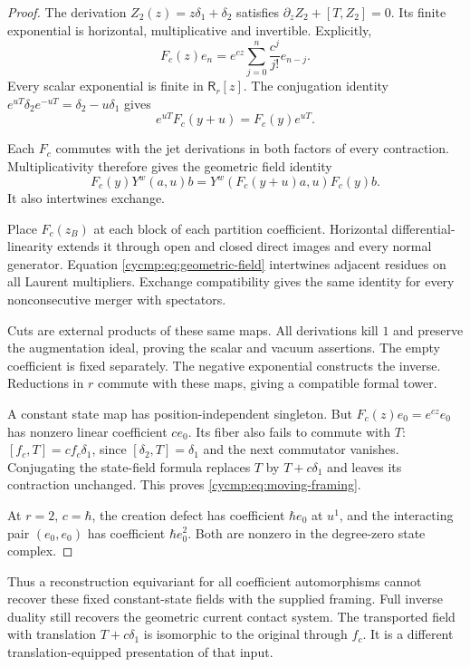 \begin{proof}
The derivation $Z_2(z)=z\delta_1+\delta_2$ satisfies
$\partial_zZ_2+[T,Z_2]=0$. Its finite exponential is horizontal,
multiplicative and invertible. Explicitly,
\[
 F_c(z)e_n=e^{cz}\sum_{j=0}^n\frac{c^j}{j!}e_{n-j}.
\]
Every scalar exponential is finite in $\mathsf R_r[z]$.
The conjugation identity
$e^{uT}\delta_2e^{-uT}=\delta_2-u\delta_1$ gives
\[
 e^{uT}F_c(y+u)=F_c(y)e^{uT}.
\]

Each $F_c$ commutes with the jet derivations in both factors of
every contraction. Multiplicativity therefore gives the geometric
field identity
\begin{equation}\label{cycmp:eq:geometric-field}
 F_c(y)Y^w(a,u)b
       =Y^w(F_c(y+u)a,u)F_c(y)b.
\end{equation}
It also intertwines exchange.

Place $F_c(z_B)$ at each block of each partition coefficient.
Horizontal differential-linearity extends it through open and closed
direct images and every normal generator. Equation
\eqref{cycmp:eq:geometric-field} intertwines adjacent residues on
all Laurent multipliers. Exchange compatibility gives the same
identity for every nonconsecutive merger with spectators.

Cuts are external products of these same maps. All derivations
kill $1$ and preserve the augmentation ideal, proving the scalar
and vacuum assertions. The empty coefficient is fixed separately.
The negative exponential constructs the inverse. Reductions in
$r$ commute with these maps, giving a compatible formal tower.

A constant state map has position-independent singleton. But
$F_c(z)e_0=e^{cz}e_0$ has nonzero linear coefficient $ce_0$.
Its fiber also fails to commute with $T$:
$[f_c,T]=cf_c\delta_1$, since $[\delta_2,T]=\delta_1$ and the
next commutator vanishes. Conjugating the state-field formula
replaces $T$ by $T+c\delta_1$ and leaves its contraction unchanged.
This proves \eqref{cycmp:eq:moving-framing}.

At $r=2$, $c=\hbar$, the creation defect has coefficient
$\hbar e_0$ at $u^1$, and the interacting pair $(e_0,e_0)$ has
coefficient $\hbar e_0^2$. Both are nonzero in the degree-zero
state complex.
\end{proof}

Thus a reconstruction equivariant for all coefficient automorphisms
cannot recover these fixed constant-state fields with the supplied
framing. Full inverse duality still recovers the geometric current
contact system. The transported field with translation
$T+c\delta_1$ is isomorphic to the original through $f_c$. It is a
different translation-equipped presentation of that input.

